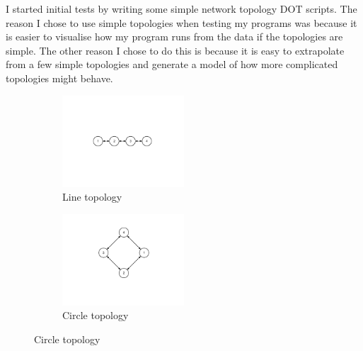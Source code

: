 \documentclass[12pt]{article}
\begin{document}
I started initial tests by writing some simple network topology DOT
scripts. The reason I chose to use simple topologies
when testing my programs was  because it is easier to
visualise how my program runs from the data if the topologies
are simple. The other reason I chose to do this is because
it is easy to extrapolate from a few simple topologies and
generate a model of how more complicated topologies might
behave.
\begin{figure}[htp]
    \begin{subfigure}[b]{0.5\textwidth}
        \centering
        \includegraphics[clip,trim=45mm 60mm 45mm 60mm,width=0.5\textwidth]{images/line-topo.pdf}
        \caption{Line topology}
        \label{fig:line_topology}
    \end{subfigure}
    \begin{subfigure}[b]{0.5\textwidth}
        \centering
        \includegraphics[clip,trim=45mm 40mm 45mm 20mm,width=0.5\textwidth]{images/circle-topo.pdf}
        \caption{Circle topology}
        \label{fig:circle_topology}
    \end{subfigure}


\end{figure}
\end{document}
